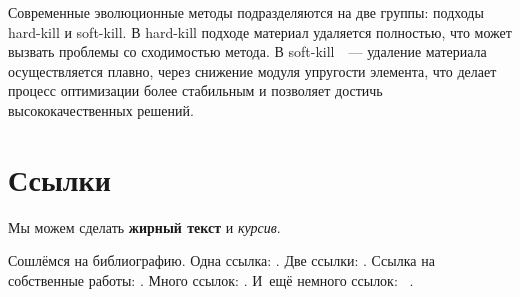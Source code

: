 Современные эволюционные методы подразделяются на две группы: подходы hard-kill и soft-kill. В hard-kill подходе материал удаляется полностью, что может вызвать проблемы со сходимостью метода. В soft-kill~\cite{Ghabraie2015}~--- удаление материала осуществляется плавно, через снижение модуля упругости элемента, что делает процесс оптимизации более стабильным и позволяет достичь высококачественных решений.















\section{Ссылки}\label{sec:ch1/sec2}

Мы можем сделать \textbf{жирный текст} и \textit{курсив}.

Сошлёмся на библиографию.
Одна ссылка: \cite[с.~54]{Sokolov}\cite[с.~36]{Gaidaenko}.
Две ссылки: \cite{Sokolov,Gaidaenko}.
Ссылка на собственные работы: \cite{vakbib1, confbib2}.
Много ссылок: %
\cite{Lermontov, Management, Borozda, Marketing, Constitution, FamilyCode,
    Gost.7.0.53, Razumovski, Lagkueva, Pokrovski, Methodology, Berestova,
    Kriger}%
%
.
И~ещё немного ссылок:~\cite{Article,Book,Booklet,Conference,Inbook,Incollection,Manual,Mastersthesis,
    Misc,Phdthesis,Proceedings,Techreport,Unpublished}
\cite{medvedev2006jelektronnye, CEAT:CEAT581, doi:10.1080/01932691.2010.513279,
    Gosele1999161,Li2007StressAnalysis, Shoji199895, test:eisner-sample,
    test:eisner-sample-shorted, AB_patent_Pomerantz_1968, iofis_patent1960}%
%
.

